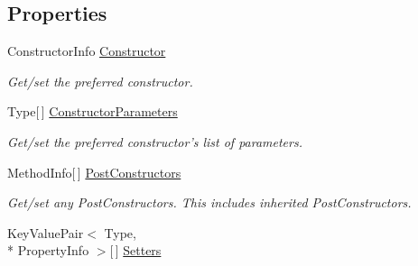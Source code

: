 \subsection*{Properties}
\begin{DoxyCompactItemize}
\item 
\hypertarget{interfacestrange_1_1extensions_1_1reflector_1_1api_1_1_i_reflected_class_a55dff19dec4a047c73c444e600b9b40c}{Constructor\-Info \hyperlink{interfacestrange_1_1extensions_1_1reflector_1_1api_1_1_i_reflected_class_a55dff19dec4a047c73c444e600b9b40c}{Constructor}}\label{interfacestrange_1_1extensions_1_1reflector_1_1api_1_1_i_reflected_class_a55dff19dec4a047c73c444e600b9b40c}

\begin{DoxyCompactList}\small\item\em Get/set the preferred constructor. \end{DoxyCompactList}\item 
\hypertarget{interfacestrange_1_1extensions_1_1reflector_1_1api_1_1_i_reflected_class_a96ffdcc0614018dccbbf7d19132cb928}{Type\mbox{[}$\,$\mbox{]} \hyperlink{interfacestrange_1_1extensions_1_1reflector_1_1api_1_1_i_reflected_class_a96ffdcc0614018dccbbf7d19132cb928}{Constructor\-Parameters}}\label{interfacestrange_1_1extensions_1_1reflector_1_1api_1_1_i_reflected_class_a96ffdcc0614018dccbbf7d19132cb928}

\begin{DoxyCompactList}\small\item\em Get/set the preferred constructor's list of parameters. \end{DoxyCompactList}\item 
\hypertarget{interfacestrange_1_1extensions_1_1reflector_1_1api_1_1_i_reflected_class_ae4873ef7104aa39518e9f74351919788}{Method\-Info\mbox{[}$\,$\mbox{]} \hyperlink{interfacestrange_1_1extensions_1_1reflector_1_1api_1_1_i_reflected_class_ae4873ef7104aa39518e9f74351919788}{Post\-Constructors}}\label{interfacestrange_1_1extensions_1_1reflector_1_1api_1_1_i_reflected_class_ae4873ef7104aa39518e9f74351919788}

\begin{DoxyCompactList}\small\item\em Get/set any Post\-Constructors. This includes inherited Post\-Constructors. \end{DoxyCompactList}\item 
\hypertarget{interfacestrange_1_1extensions_1_1reflector_1_1api_1_1_i_reflected_class_ad527577be4e76931e92fbe6dc68e26bd}{Key\-Value\-Pair$<$ Type, \\*
Property\-Info $>$\mbox{[}$\,$\mbox{]} \hyperlink{interfacestrange_1_1extensions_1_1reflector_1_1api_1_1_i_reflected_class_ad527577be4e76931e92fbe6dc68e26bd}{Setters}}\label{interfacestrange_1_1extensions_1_1reflector_1_1api_1_1_i_reflected_class_ad527577be4e76931e92fbe6dc68e26bd}


\end{DoxyCompactItemize}
